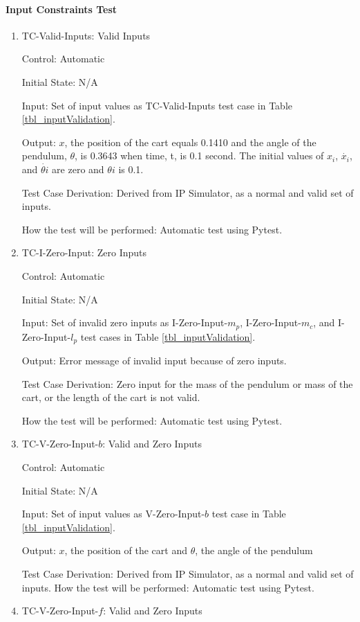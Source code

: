 \documentclass[12pt, titlepage]{article}
\begin{document}
 
\paragraph{Input Constraints Test}

\begin{enumerate}

\item{TC-Valid-Inputs: Valid Inputs}

Control: Automatic
					
Initial State: N/A 
					
Input: Set of input values as TC-Valid-Inputs test case in Table \ref{tbl_inputValidation}.

Output: $x$, the position of the cart equals  0.1410 and the angle of the pendulum, $\theta$, is 0.3643 when time, t, is 0.1 second. The initial values of $x_i$, $\dot{x_i}$, and $\dot{\theta{i}}$ are zero and $\theta{i}$ is 0.1.

Test Case Derivation: Derived from IP Simulator, as a normal and valid set of inputs.
					
How the test will be performed: Automatic test using Pytest.

\item{TC-I-Zero-Input: Zero Inputs}

Control: Automatic
					
Initial State: N/A 
					
Input: Set of invalid zero inputs as I-Zero-Input-$m_p$, I-Zero-Input-$m_c$, and I-Zero-Input-$l_p$ test cases in Table \ref{tbl_inputValidation}.
					
Output: Error message of invalid input because of zero inputs.

Test Case Derivation: Zero input for the mass of the pendulum or mass of the cart, or the length of the cart is not valid.
					
How the test will be performed: Automatic test using Pytest.

\item{TC-V-Zero-Input-$b$: Valid and Zero Inputs}

Control: Automatic
					
Initial State: N/A 
					
Input: Set of input values as V-Zero-Input-$b$ test case in Table \ref{tbl_inputValidation}.
					
Output: $x$, the position of the cart and $\theta$, the angle of the pendulum

Test Case Derivation: Derived from IP Simulator, as a normal and valid set of inputs.
How the test will be performed: Automatic test using Pytest.
\item{TC-V-Zero-Input-$f$: Valid and Zero Inputs}


\end{enumerate}
\end{document}
